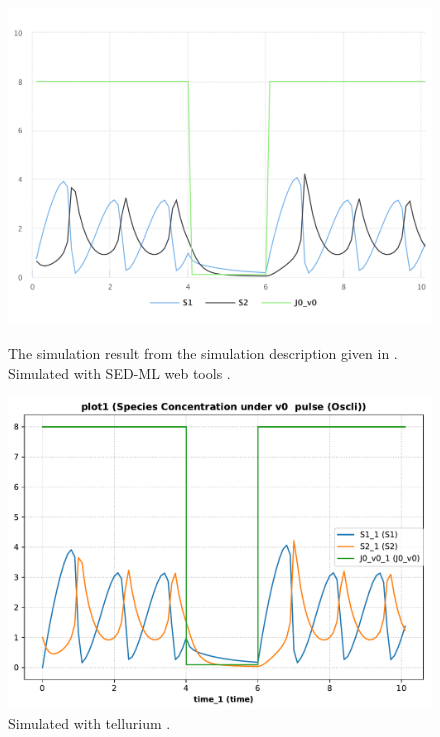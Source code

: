 \begin{figure}[ht]
    \centering
    \begin{minipage}{0.47\textwidth}
        \centering
        \includegraphics[width=1.0\textwidth]{examples/oscli-nested-pulse/results/sedml_webtools/plot1}
        \caption{The simulation result from the simulation description given in . Simulated with SED-ML web tools \citep{bergmann2017sed}.}
    \end{minipage}\hfill
    \begin{minipage}{0.47\textwidth}
        \centering
        \includegraphics[width=1.0\textwidth]{examples/oscli-nested-pulse/results/tellurium/plot1}
        \caption{Simulated with tellurium \citep{tellurium}.}
    \end{minipage}
    \label{fig:oscli-nested-pulse}
\end{figure}

